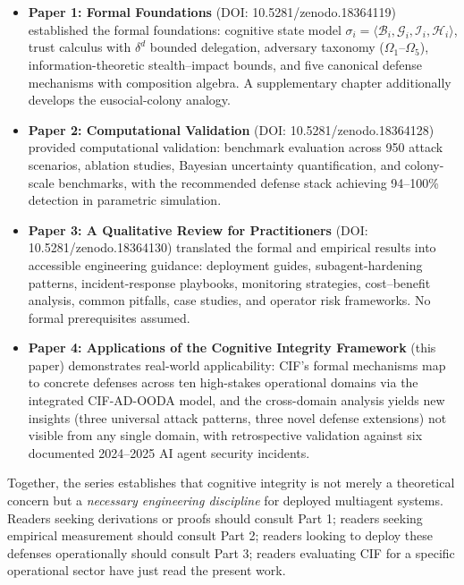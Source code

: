 \documentclass[
]{article}
\providecommand{\tightlist}{%
  \setlength{\itemsep}{0pt}\setlength{\parskip}{0pt}}
\begin{document}
\begin{itemize}
\tightlist
\item
  \textbf{Paper 1: Formal Foundations} \cite{friedman2026cogsec1} (DOI:
  10.5281/zenodo.18364119) established the formal foundations: cognitive
  state model
  \(\sigma_i = \langle \mathcal{B}_i, \mathcal{G}_i, \mathcal{I}_i, \mathcal{H}_i \rangle\),
  trust calculus with \(\delta^d\) bounded delegation, adversary
  taxonomy (\(\Omega_1\)--\(\Omega_5\)), information-theoretic
  stealth--impact bounds, and five canonical defense mechanisms with
  composition algebra. A supplementary chapter additionally develops the
  eusocial-colony analogy.
\item
  \textbf{Paper 2: Computational Validation} \cite{friedman2026cogsec2}
  (DOI: 10.5281/zenodo.18364128) provided computational validation:
  benchmark evaluation across 950 attack scenarios, ablation studies,
  Bayesian uncertainty quantification, and colony-scale benchmarks, with
  the recommended defense stack achieving 94--100\% detection in
  parametric simulation.
\item
  \textbf{Paper 3: A Qualitative Review for Practitioners}
  \cite{friedman2026cogsec3} (DOI: 10.5281/zenodo.18364130) translated
  the formal and empirical results into accessible engineering guidance:
  deployment guides, subagent-hardening patterns, incident-response
  playbooks, monitoring strategies, cost--benefit analysis, common
  pitfalls, case studies, and operator risk frameworks. No formal
  prerequisites assumed.
\item
  \textbf{Paper 4: Applications of the Cognitive Integrity Framework}
  (this paper) demonstrates real-world applicability: CIF's formal
  mechanisms map to concrete defenses across ten high-stakes operational
  domains via the integrated CIF-AD-OODA model, and the cross-domain
  analysis yields new insights (three universal attack patterns, three
  novel defense extensions) not visible from any single domain, with
  retrospective validation against six documented 2024--2025 AI agent
  security incidents.
\end{itemize}

Together, the series establishes that cognitive integrity is not merely
a theoretical concern but a \emph{necessary engineering discipline} for
deployed multiagent systems. Readers seeking derivations or proofs
should consult Part 1; readers seeking empirical measurement should
consult Part 2; readers looking to deploy these defenses operationally
should consult Part 3; readers evaluating CIF for a specific operational
sector have just read the present work.
\end{document}
